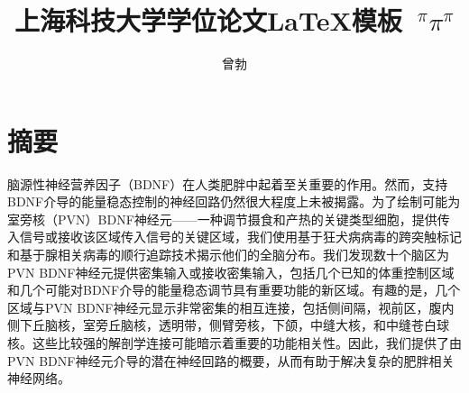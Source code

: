 \confidential{}%
\title{上海科技大学学位论文\LaTeX{}模板 {$~^{\pi}\pi^{\pi}$}}%
\author{曾勃}%
\advisorsec{}%

\maketitle%
\makeenglishtitle%
\makedeclaration%
\chapter*{摘\quad 要}%
\setcounter{page}{1}%

脑源性神经营养因子（BDNF）在人类肥胖中起着至关重要的作用。然而，支持BDNF介导的能量稳态控制的神经回路仍然很大程度上未被揭露。为了绘制可能为室旁核（PVN）BDNF神经元——一种调节摄食和产热的关键类型细胞，提供传入信号或接收该区域传入信号的关键区域，我们使用基于狂犬病病毒的跨突触标记和基于腺相关病毒的顺行追踪技术揭示他们的全脑分布。我们发现数十个脑区为PVN BDNF神经元提供密集输入或接收密集输入，包括几个已知的体重控制区域和几个可能对BDNF介导的能量稳态调节具有重要功能的新区域。有趣的是，几个区域与PVN BDNF神经元显示非常密集的相互连接，包括侧间隔，视前区，腹内侧下丘脑核，室旁丘脑核，透明带，侧臂旁核，下颌，中缝大核，和中缝苍白球核。这些比较强的解剖学连接可能暗示着重要的功能相关性。因此，我们提供了由PVN BDNF神经元介导的潜在神经回路的概要，从而有助于解决复杂的肥胖相关神经网络。

